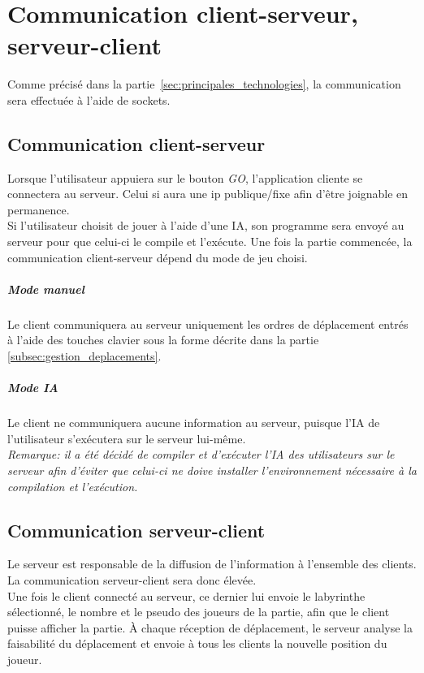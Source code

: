 \chapter{Communication client-serveur, serveur-client}
    Comme précisé dans la partie~\ref{sec:principales_technologies}, la communication sera effectuée à l'aide de sockets.


    \section{Communication client-serveur}
        Lorsque l'utilisateur appuiera sur le bouton \emph{GO}, l'application cliente se connectera au serveur. Celui si aura une ip publique/fixe afin d'être joignable en permanence.\\

        Si l'utilisateur choisit de jouer à l'aide d'une IA, son programme sera envoyé au serveur pour que celui-ci le compile et l'exécute. Une fois la partie commencée, la communication client-serveur dépend du mode de jeu choisi.

        \paragraph{Mode manuel} Le client communiquera au serveur uniquement les ordres de déplacement entrés à l'aide des touches clavier sous la forme décrite dans la partie \ref{subsec:gestion_deplacements}.

        \paragraph{Mode IA} Le client ne communiquera aucune information au serveur, puisque l'IA de l'utilisateur s'exécutera sur le serveur lui-même. \\

        \emph{Remarque: il a été décidé de compiler et d'exécuter l'IA des utilisateurs sur le serveur afin d'éviter que celui-ci ne doive installer l'environnement nécessaire à la compilation et l'exécution.}


    \section{Communication serveur-client}
        Le serveur est responsable de la diffusion de l'information à l'ensemble des clients. La communication serveur-client sera donc élevée. \\

        Une fois le client connecté au serveur, ce dernier lui envoie le labyrinthe sélectionné, le nombre et le pseudo des joueurs de la partie, afin que le client puisse afficher la partie. À chaque réception de déplacement, le serveur analyse la faisabilité du déplacement et envoie à tous les clients la nouvelle position du joueur.
